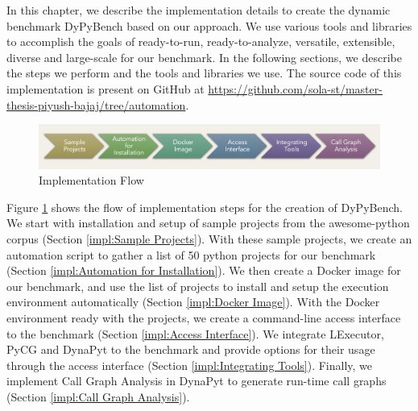 In this chapter, we describe the implementation details to create the dynamic benchmark DyPyBench based on our approach.
We use various tools and libraries to accomplish the goals of ready-to-run, ready-to-analyze, versatile, extensible, diverse and large-scale for our benchmark.
In the following sections, we describe the steps we perform and the tools and libraries we use.
The source code of this implementation is present on GitHub at \url{https://github.com/sola-st/master-thesis-piyush-bajaj/tree/automation}.

\begin{figure}[ht]
    \centering
    \includegraphics[width=1\linewidth]{figures/implementation/implementaion_flow.png}
    \caption{Implementation Flow}
    \label{fig:implementation_flow}
\end{figure}
Figure \ref{fig:implementation_flow} shows the flow of implementation steps for the creation of DyPyBench. 
We start with installation and setup of sample projects from the awesome-python corpus (Section \ref{impl:Sample Projects}).
With these sample projects, we create an automation script to gather a list of 50 python projects for our benchmark (Section \ref{impl:Automation for Installation}).
We then create a Docker image for our benchmark, and use the list of projects to install and setup the execution environment automatically (Section \ref{impl:Docker Image}).
With the Docker environment ready with the projects, we create a command-line access interface to the benchmark (Section \ref{impl:Access Interface}).   
We integrate LExecutor, PyCG and DynaPyt to the benchmark and provide options for their usage through the access interface (Section \ref{impl:Integrating Tools}).
Finally, we implement Call Graph Analysis in DynaPyt to generate run-time call graphs (Section \ref{impl:Call Graph Analysis}).

